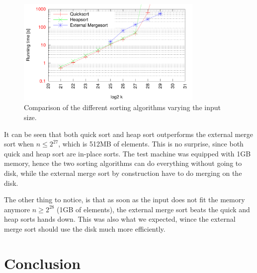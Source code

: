 \documentclass[a4paper,12pt]{article}
\begin{document}
\begin{figure}[h!]
  \centering
  \includegraphics[width=0.8\textwidth]{best_sort}
  \caption{Comparison of the different sorting algorithms varying the input size.}
  \label{fig:best-sort}
\end{figure}

It can be seen that both quick sort and heap sort outperforms the
external merge sort when $n \leq 2^{27}$, which is 512MB of
elements. This is no surprise, since both quick and heap sort are
in-place sorts. The test machine was equipped with 1GB memory, hence
the two sorting algorithms can do everything without going to disk,
while the external merge sort by construction have to do merging on
the disk.

The other thing to notice, is that as soon as the input does not fit
the memory anymore $n \geq 2^{28}$ (1GB of elements), the external
merge sort beats the quick and heap sorts hands down. This was also
what we expected, wince the external merge sort should use the disk
much more efficiently.

\section{Conclusion}


\clearpage{}
\end{document}
